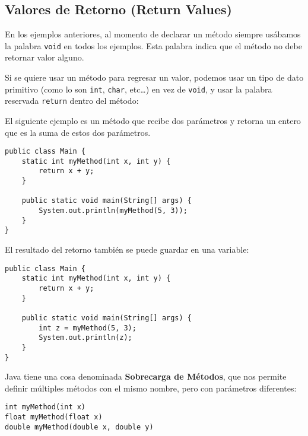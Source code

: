 \documentclass[12pt]{article}
\theoremstyle{largebreak}
\begin{document}
    \subsection{Valores de Retorno (Return Values)}

    En los ejemplos anteriores, al momento de declarar un método siempre usábamos la palabra \lstinline|void| en todos los ejemplos. Esta palabra indica que el método no debe retornar valor alguno.

    Si se quiere usar un método para regresar un valor, podemos usar un tipo de dato primitivo (como lo son \lstinline|int|, \lstinline|char|, etc\dots) en vez de \lstinline|void|, y usar la palabra reservada \lstinline|return| dentro del método:

    \begin{exa}
        El siguiente ejemplo es un método que recibe dos parámetros y retorna un entero que es la suma de estos dos parámetros.
        \begin{lstlisting}[caption={Ejemplo Método que Retorna \lstinline|int|.},label=DescriptiveLabel]
public class Main {
    static int myMethod(int x, int y) {
        return x + y;
    }

    public static void main(String[] args) {
        System.out.println(myMethod(5, 3));
    }
}
        \end{lstlisting}
        El resultado del retorno también se puede guardar en una variable:
        \begin{lstlisting}[caption={Ejemplo Método que Retorna \lstinline|int|.},label=DescriptiveLabel]
public class Main {
    static int myMethod(int x, int y) {
        return x + y;
    }

    public static void main(String[] args) {
        int z = myMethod(5, 3);
        System.out.println(z);
    }
}
        \end{lstlisting}
    \end{exa}

    \begin{obs}
        Java tiene una cosa denominada \textbf{Sobrecarga de Métodos}, que nos permite definir múltiples métodos con el mismo nombre, pero con parámetros diferentes:
        \begin{lstlisting}[caption={Sobrecarga de Métodos o Method Overloading.},label=DescriptiveLabel]
int myMethod(int x)
float myMethod(float x)
double myMethod(double x, double y)
        \end{lstlisting}
    \end{obs}
\end{document}
